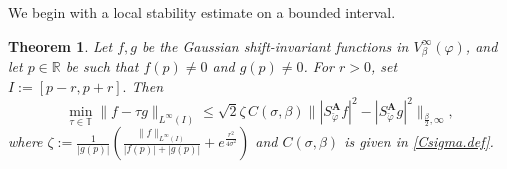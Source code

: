 \documentclass[11pt, reqno]{amsart}
\newtheorem{theorem}{Theorem}[section]
\newcommand{\R}{\mathbb{R}}
\newcommand{\T}{\mathbb{T}}
\numberwithin{equation}{section}
\begin{document}
\smallskip 
We begin with a local stability estimate on a bounded interval.

\begin{theorem}\label{local.stable.thm1}
Let $f,g$ be the Gaussian shift-invariant functions in $V_\beta^\infty(\varphi)$, and let $p\in\R$ be such that
$f(p)\neq 0$ and $g(p)\neq 0$. For $r>0$, set  $ I:=[p-r,p+r].$
Then
\begin{equation}\label{local.stable.eq1}
\min_{\tau \in \T}\|f-\tau g\|_{L^\infty(I)} \le
\sqrt{2}\zeta\,C(\sigma,\beta)\bigl\||S_{\check{\varphi}}^{\mathbf A}f|^2-|S_{\check{\varphi}}^{\mathbf A}g|^2\bigr\|_{\frac{\beta}{2},\infty},
\end{equation}
where $\zeta := \frac{1}{|g(p)|} \left( \frac{\|f\|_{L^\infty(I)}}{|f(p)| + |g(p)|} + e^{\frac{r^2}{4\sigma^2}} \right)$ and $C(\sigma,\beta)$ is given in \eqref{Csigma.def}. 
\end{theorem}
\end{document}
